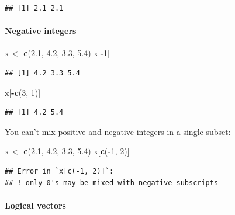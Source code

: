 \documentclass[
]{book}
\newenvironment{Shaded}{\begin{snugshade}}{\end{snugshade}}
\newcommand{\DecValTok}[1]{\textcolor[rgb]{0.00,0.00,0.81}{#1}}
\newcommand{\FloatTok}[1]{\textcolor[rgb]{0.00,0.00,0.81}{#1}}
\newcommand{\FunctionTok}[1]{\textcolor[rgb]{0.13,0.29,0.53}{\textbf{#1}}}
\newcommand{\NormalTok}[1]{#1}
\newcommand{\OtherTok}[1]{\textcolor[rgb]{0.56,0.35,0.01}{#1}}
\newcommand{\SpecialCharTok}[1]{\textcolor[rgb]{0.81,0.36,0.00}{\textbf{#1}}}
\begin{document}
\begin{verbatim}
## [1] 2.1 2.1
\end{verbatim}

\paragraph{Negative integers}\label{negative-integers}

\begin{Shaded}
\begin{Highlighting}[]
\NormalTok{x }\OtherTok{\textless{}{-}} \FunctionTok{c}\NormalTok{(}\FloatTok{2.1}\NormalTok{, }\FloatTok{4.2}\NormalTok{, }\FloatTok{3.3}\NormalTok{, }\FloatTok{5.4}\NormalTok{)}
\NormalTok{x[}\SpecialCharTok{{-}}\DecValTok{1}\NormalTok{]}
\end{Highlighting}
\end{Shaded}

\begin{verbatim}
## [1] 4.2 3.3 5.4
\end{verbatim}

\begin{Shaded}
\begin{Highlighting}[]
\NormalTok{x[}\SpecialCharTok{{-}}\FunctionTok{c}\NormalTok{(}\DecValTok{3}\NormalTok{, }\DecValTok{1}\NormalTok{)]}
\end{Highlighting}
\end{Shaded}

\begin{verbatim}
## [1] 4.2 5.4
\end{verbatim}

You can't mix positive and negative integers in a single subset:

\begin{Shaded}
\begin{Highlighting}[]
\NormalTok{x }\OtherTok{\textless{}{-}} \FunctionTok{c}\NormalTok{(}\FloatTok{2.1}\NormalTok{, }\FloatTok{4.2}\NormalTok{, }\FloatTok{3.3}\NormalTok{, }\FloatTok{5.4}\NormalTok{)}
\NormalTok{x[}\FunctionTok{c}\NormalTok{(}\SpecialCharTok{{-}}\DecValTok{1}\NormalTok{, }\DecValTok{2}\NormalTok{)]}
\end{Highlighting}
\end{Shaded}

\begin{verbatim}
## Error in `x[c(-1, 2)]`:
## ! only 0's may be mixed with negative subscripts
\end{verbatim}

\paragraph{Logical vectors}\label{logical-vectors}
\end{document}
